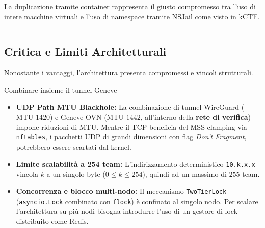 La duplicazione tramite container rappresenta il giusto compromesso tra
l'uso di intere macchine virtuali e l'uso di namespace tramite NSJail
come visto in kCTF.

\begin{center}\rule{0.5\linewidth}{0.5pt}\end{center}

\subsection{Critica e Limiti
Architetturali}\label{critica-e-limiti-architetturali}

Nonostante i vantaggi, l'architettura presenta compromessi e vincoli
strutturali.

Combinare insieme il tunnel Geneve

\begin{itemize}
\tightlist
\item
  \textbf{UDP Path MTU Blackhole:} La combinazione di tunnel WireGuard
  (\(\text{MTU } 1420\)) e Geneve OVN (\(\text{MTU } 1442\), all'interno
  della \textbf{rete di verifica}) impone riduzioni di MTU. Mentre il
  TCP beneficia del MSS clamping via \passthrough{\lstinline!nftables!},
  i pacchetti UDP di grandi dimensioni con flag \emph{Don't Fragment},
  potrebbero essere scartati dal kernel.
\item
  \textbf{Limite scalabilità a 254 team:} L'indirizzamento
  deterministico \passthrough{\lstinline!10.k.x.x!} vincola \(k\) a un
  singolo byte (\(0 \le k \le 254\)), quindi ad un massimo di
  \(\text{255}\) team.
\item
  \textbf{Concorrenza e blocco multi-nodo:} Il meccanismo
  \passthrough{\lstinline!TwoTierLock!}
  (\passthrough{\lstinline!asyncio.Lock!} combinato con
  \passthrough{\lstinline!flock!}) è confinato al singolo nodo. Per
  scalare l'architettura su più nodi bisogna introdurre l'uso di un
  gestore di lock distribuito come Redis.
\end{itemize}
